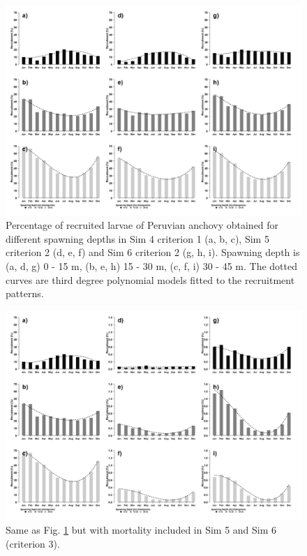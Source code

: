 \begin{figure}[ht]
	\includegraphics[width=1.0\textwidth]{figures/Fig3_06.png}
	\centering
	\caption{Percentage of recruited larvae of Peruvian anchovy obtained for different spawning depths in Sim 4 criterion 1 (a, b, c), Sim 5 criterion 2 (d, e, f) and Sim 6 criterion 2 (g, h, i). Spawning depth is (a, d, g) 0 - 15 m, (b, e, h) 15 - 30 m, (c, f, i) 30 - 45 m. The dotted curves are third degree polynomial models fitted to the recruitment patterns.}
	\label{Fig3_06}
\end{figure}

\begin{figure}[ht]
	\includegraphics[width=1.0\textwidth]{figures/Fig3_07.png}
	\centering
	\caption{Same as Fig. \ref{Fig3_06} but with mortality included in Sim 5 and Sim 6 (criterion 3).}
	\label{Fig3_07}
\end{figure}

